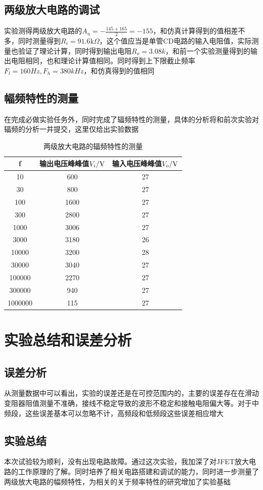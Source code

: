 \documentclass[UTF8,a4paper]{ctexart}
\begin{document}
\subsection{两级放大电路的调试}
实验测得两级放大电路的$A_u=-\frac{145+165}{2}=-155$，和仿真计算得到的值相差不多，同时测量得到$R_i=91.6\mathrm{k}\Omega$，这个值应当是单管CD电路的输入电阻值，实际测量也验证了理论计算，同时得到输出电阻$R_o=3.08k$，和前一个实验测量得到的输出电阻相同，也和理论计算值相同。同时得到上下限截止频率$F_l=160Hz,F_h=380kHz$，和仿真得到的值相同
\subsection{幅频特性的测量}
在完成必做实验任务外，同时完成了辐频特性的测量，具体的分析将和前次实验对辐频的分析一并提交，这里仅给出实验数据
\begin{table}
\caption{两级放大电路的辐频特性的测量}
\begin{tabular}{|c|c|c|}
\hline
f&输出电压峰峰值$V_i/\rm{V}$&输入电压峰峰值$V_o/\rm{V}$ \\
\hline
10&600&27\\
\hline
30&800&27\\
\hline
100&1600&27\\
\hline
300&2800&27\\
\hline
1000&3006&27\\
\hline
3000&3180&26\\
\hline
10000&3200&28\\
\hline
30000&3040&27\\
\hline
100000&2270&27\\
\hline
300000&940&27\\
\hline
1000000&115&27\\
\hline
\end{tabular}
\end{table}
\section{实验总结和误差分析}
\subsection{误差分析}
从测量数据中可以看出，实验的误差还是在可控范围内的，主要的误差存在在滑动变阻器阻值测量不准确，接线不稳定导致的波形不稳定和接触电阻偏大等。对于中频段，这些误差基本可以忽略不计，高频段和低频段这些误差相应增大
\subsection{实验总结}
本次试验较为顺利，没有出现电路故障。通过这次实验，我加深了对JFET放大电路的工作原理的了解。同时培养了相关电路搭建和调试的能力，同时进一步测量了两级放大电路的幅频特性，为相关的关于频率特性的研究增加了实验基础
\end{document}
